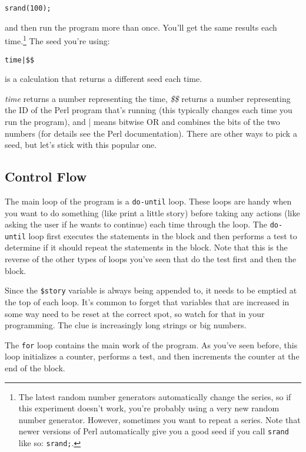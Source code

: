 \begin{lstlisting}
srand(100);
\end{lstlisting}

and then run the program more than once. You'll get the same results each time.\footnote{The latest random number generators automatically change the series, so if this experiment doesn't work, you're probably using a very new random number generator. However, sometimes you want to repeat a series. Note that newer versions of Perl automatically give you a good seed if you call \verb|srand| like so: \verb|srand;|.} The seed you're using: 

\begin{lstlisting}
time|$$ 
\end{lstlisting}

is a calculation that returns a different seed each time.

\textit{time} returns a number representing the time, \textit{\$\$} returns a number representing the ID of the Perl program that's running (this typically changes each time you run the program), and | means bitwise OR and combines the bits of the two numbers (for details see the Perl documentation). There are other ways to pick a seed, but let's stick with this popular one.

\subsection{Control Flow}
The main loop of the program is a \verb|do-until| loop. These loops are handy when you want to do something (like print a little story) before taking any actions (like asking the user if he wants to continue) each time through the loop. The \verb|do-until| loop first executes the statements in the block and then performs a test to determine if it should repeat the statements in the block. Note that this is the reverse of the other types of loops you've seen that do the test first and then the block.

Since the \verb|$story| variable is always being appended to, it needs to be emptied at the top of each loop. It's common to forget that variables that are increased in some way need to be reset at the correct spot, so watch for that in your programming. The clue is increasingly long strings or big numbers.

The \verb|for| loop contains the main work of the program. As you've seen before, this loop initializes a counter, performs a test, and then increments the counter at the end of the block.

